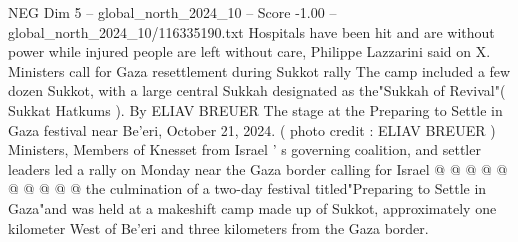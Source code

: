 \begin{textsample}{NEG Dim 5 – global\_north\_2024\_10 – Score -1.00 – global\_north\_2024\_10/116335190.txt}
Hospitals have been hit and are without power while injured people are left without care, Philippe Lazzarini said on X.
Ministers call for Gaza resettlement during Sukkot rally The camp included a few dozen Sukkot, with a large central Sukkah designated as the"Sukkah of Revival"( Sukkat Hatkums ).
By ELIAV BREUER The stage at the Preparing to Settle in Gaza festival near Be'eri, October 21, 2024. ( photo credit : ELIAV BREUER ) Ministers, Members of Knesset from Israel ' s governing coalition, and settler leaders led a rally on Monday near the Gaza border calling for Israel @ @ @ @ @ @ @ @ @ @ the culmination of a two-day festival titled"Preparing to Settle in Gaza"and was held at a makeshift camp made up of Sukkot, approximately one kilometer West of Be'eri and three kilometers from the Gaza border.

\end{textsample}
